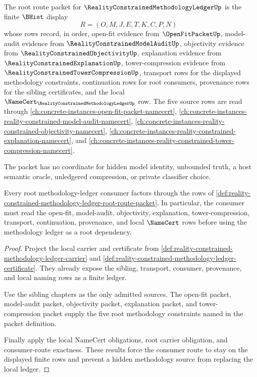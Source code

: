 \begin{definition}
\label{def:reality-constrained-methodology-ledger-root-route-packet}
The root route packet for $\RealityConstrainedMethodologyLedgerUp$ is the finite $\BHist$ display
$$
R=(O,M,J,E,T,K,C,P,N)
$$
whose rows record, in order, open-fit evidence from $\OpenFitPacketUp$, model-audit evidence from $\RealityConstrainedModelAuditUp$, objectivity evidence from $\RealityConstrainedObjectivityUp$, explanation evidence from $\RealityConstrainedExplanationUp$, tower-compression evidence from $\RealityConstrainedTowerCompressionUp$, transport rows for the displayed methodology constraints, continuation rows for root consumers, provenance rows for the sibling certificates, and the local $\NameCert_{\RealityConstrainedMethodologyLedgerUp}$ row.
The five source rows are read through \autoref{ch:concrete-instances-open-fit-packet-namecert}, \autoref{ch:concrete-instances-reality-constrained-model-audit-namecert}, \autoref{ch:concrete-instances-reality-constrained-objectivity-namecert}, \autoref{ch:concrete-instances-reality-constrained-explanation-namecert}, and \autoref{ch:concrete-instances-reality-constrained-tower-compression-namecert}.

The packet has no coordinate for hidden model identity, unbounded truth, a host semantic oracle, unledgered compression, or private classifier choice.
\end{definition}

\begin{theorem}
\label{thm:reality-constrained-methodology-ledger-root-route-totality}
Every root methodology-ledger consumer factors through the rows of \autoref{def:reality-constrained-methodology-ledger-root-route-packet}. In particular, the consumer must read the open-fit, model-audit, objectivity, explanation, tower-compression, transport, continuation, provenance, and local $\NameCert$ rows before using the methodology ledger as a root dependency.
\end{theorem}
\begin{proof}
Project the local carrier and certificate from \autoref{def:reality-constrained-methodology-ledger-carrier} and \autoref{def:reality-constrained-methodology-ledger-certificate}. They already expose the sibling, transport, consumer, provenance, and local naming rows as a finite ledger.

Use the sibling chapters as the only admitted sources. The open-fit packet, model-audit packet, objectivity packet, explanation packet, and tower-compression packet supply the five root methodology constraints named in the packet definition.

Finally apply the local NameCert obligations, root carrier obligation, and consumer-route exactness. These results force the consumer route to stay on the displayed finite rows and prevent a hidden methodology source from replacing the local ledger.
\end{proof}

